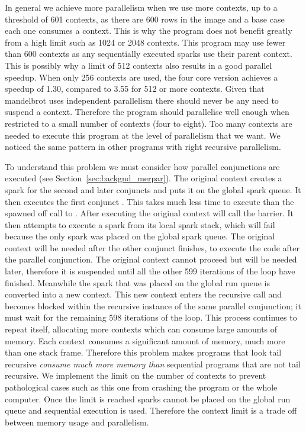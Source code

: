 In general we achieve more parallelism when we use more contexts,
up to a threshold of 601 contexts,
as there are 600 rows in the image and a base case each one consumes a
context.
This is why the program does not benefit greatly from a high limit such as
1024 or 2048 contexts.
This program may use fewer than 600 contexts as any sequentially executed
sparks use their parent context.
This is possibly why a limit of 512 contexts also results in a good parallel
speedup.
When only 256 contexts are used,
the four core version achieves a speedup of 1.30,
compared to 3.55 for 512 or more contexts.
Given that mandelbrot uses independent parallelism there should never be any
need to suspend a context.
Therefore the program should parallelise well enough when restricted to
a small number of contexts (four to eight).
Too many contexts are needed to execute this program at the level of
parallelism that we want.
We noticed the same pattern in other programs with right recursive
parallelism.

\label{context_limit}
To understand this problem we must consider how parallel conjunctions are
executed (see Section~\ref{sec:backgnd_merpar}).
The original context creates a spark for the second and later conjuncts and
puts it on the global spark queue.
It then executes the first conjunct .
This takes much less time to execute than the spawned off call to
.
After executing  the original context will call the
\joinandcontinue barrier.
It then attempts to execute a spark from its local spark stack,
which will fail because the only spark was placed on the global spark queue.
The original context will be needed after the other conjunct finishes, 
to execute the code after the parallel conjunction.
The original context cannot proceed but will be needed later,
therefore it is suspended until all the other 599 iterations of the loop
have finished.
Meanwhile the spark that was placed on the global run queue is converted
into a new context.
This new context enters the recursive call and
becomes blocked within the recursive instance of the same parallel
conjunction;
it must wait for the remaining 598 iterations of the loop.
This process continues to repeat itself,
allocating more contexts which can consume large amounts of memory.
Each context consumes a significant amount of memory,
much more than one stack frame.
Therefore
this problem makes programs that look tail recursive
\emph{consume much more memory than}
sequential programs that are not tail recursive.
We implement the limit on the number of contexts to prevent pathological
cases such as this one from crashing the program or the whole computer.
Once the limit is reached sparks cannot be placed on the global run queue
and sequential execution is used.
Therefore the context limit is a trade off between memory usage and
parallelism.

